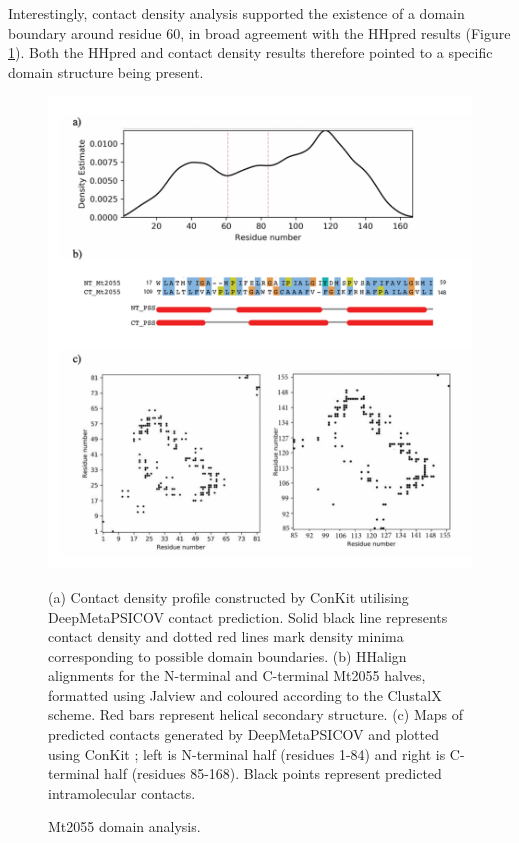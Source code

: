 Interestingly, contact density analysis \cite{Rigden2002}\cite{Sadowski2013} supported the existence of a domain boundary around residue 60, in broad agreement with the HHpred results (Figure \ref{fig:w9_dom_anal}). Both the HHpred and contact density results therefore pointed to a specific domain structure being present.

\begin{figure}[th!]
    \includegraphics[width=\textwidth]{Results/fig2.png}
    \caption{Mt2055 domain analysis. }
    \label{fig:w9_dom_anal}
    \small
    (a) Contact density profile constructed by ConKit \cite{Simkovic2017} utilising DeepMetaPSICOV contact prediction. Solid black line represents contact density and dotted red lines mark density minima corresponding to possible domain boundaries. (b) HHalign alignments for the N-terminal and C-terminal Mt2055 halves, formatted using Jalview \cite{Waterhouse2009} and coloured according to the ClustalX \cite{jeanmougin1998multiple} scheme. Red bars represent helical secondary structure. (c) Maps of predicted contacts generated by DeepMetaPSICOV \cite{Kandathil2019} and plotted using ConKit \cite{conkit2017}; left is N-terminal half (residues 1-84) and right is C-terminal half (residues 85-168). Black points represent predicted intramolecular contacts.
\end{figure}

